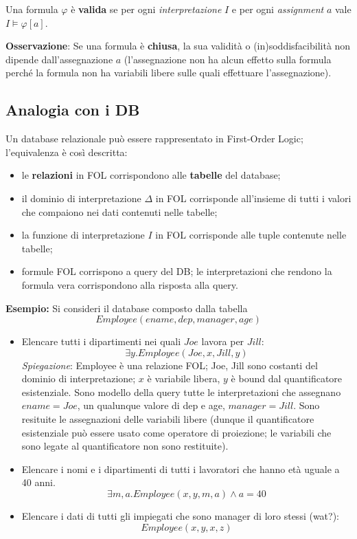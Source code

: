 Una formula $\varphi$ è \textbf{valida} se per ogni \textit{interpretazione} $I$ e per ogni \textit{assignment} $a$ vale $I \models \varphi[a]$.

\textbf{Osservazione}: Se una formula è \textbf{chiusa}, la sua validità o (in)soddisfacibilità non dipende dall'assegnazione $a$ (l'assegnazione non ha alcun effetto sulla formula perché la formula non ha variabili libere sulle quali effettuare l'assegnazione).

\subsection{Analogia con i DB}
Un database relazionale può essere rappresentato in First-Order Logic; l'equivalenza è così descritta:
\begin{itemize}
\item le \textbf{relazioni} in FOL corrispondono alle \textbf{tabelle} del database;
\item il dominio di interpretazione $\Delta$ in FOL corrisponde all'insieme di tutti i valori che compaiono nei dati contenuti nelle tabelle;
\item la funzione di interpretazione $I$ in FOL corrisponde alle tuple contenute nelle tabelle;
\item formule FOL corrispono a query del DB; le interpretazioni che rendono la formula vera corrispondono alla risposta alla query.
\end{itemize}

\textbf{Esempio:}
Si consideri il database composto dalla tabella $$Employee(ename, dep, manager, age)$$

\begin{itemize}
\item Elencare tutti i dipartimenti nei quali $Joe$ lavora per $Jill$:
$$\exists y. Employee(Joe, x, Jill, y)$$
\textit{Spiegazione}: Employee è una relazione FOL; Joe, Jill sono costanti del dominio di interpretazione; $x$ è variabile libera, $y$ è bound dal quantificatore esistenziale. Sono modello della query tutte le interpretazioni che assegnano $ename = Joe$, un qualunque valore di dep e age, $manager = Jill$. Sono resituite le assegnazioni delle variabili libere (dunque il quantificatore esistenziale può essere usato come operatore di proiezione; le variabili che sono legate al quantificatore non sono restituite).
\item Elencare i nomi e i dipartimenti di tutti i lavoratori che hanno età uguale a 40 anni.
$$\exists m, a. Employee(x, y, m, a) \land a = 40$$
\item Elencare i dati di tutti gli impiegati che sono manager di loro stessi (wat?):
$$Employee(x, y, x, z)$$
\end{itemize}

